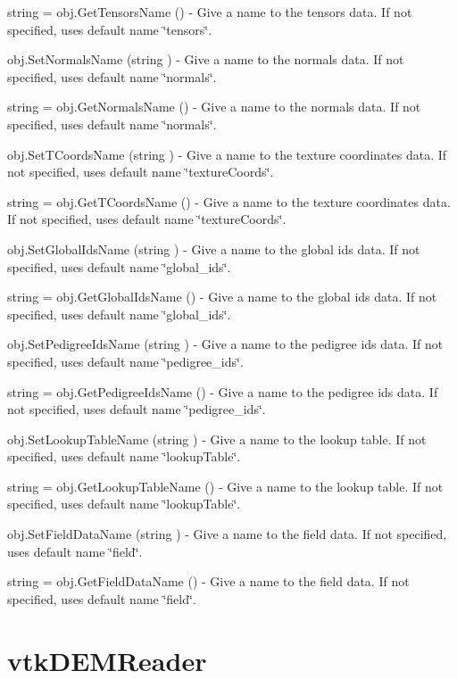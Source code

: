 \begin{DoxyItemize}
\item {\ttfamily string = obj.\-Get\-Tensors\-Name ()} -\/ Give a name to the tensors data. If not specified, uses default name \char`\"{}tensors\char`\"{}.  
\item {\ttfamily obj.\-Set\-Normals\-Name (string )} -\/ Give a name to the normals data. If not specified, uses default name \char`\"{}normals\char`\"{}.  
\item {\ttfamily string = obj.\-Get\-Normals\-Name ()} -\/ Give a name to the normals data. If not specified, uses default name \char`\"{}normals\char`\"{}.  
\item {\ttfamily obj.\-Set\-T\-Coords\-Name (string )} -\/ Give a name to the texture coordinates data. If not specified, uses default name \char`\"{}texture\-Coords\char`\"{}.  
\item {\ttfamily string = obj.\-Get\-T\-Coords\-Name ()} -\/ Give a name to the texture coordinates data. If not specified, uses default name \char`\"{}texture\-Coords\char`\"{}.  
\item {\ttfamily obj.\-Set\-Global\-Ids\-Name (string )} -\/ Give a name to the global ids data. If not specified, uses default name \char`\"{}global\-\_\-ids\char`\"{}.  
\item {\ttfamily string = obj.\-Get\-Global\-Ids\-Name ()} -\/ Give a name to the global ids data. If not specified, uses default name \char`\"{}global\-\_\-ids\char`\"{}.  
\item {\ttfamily obj.\-Set\-Pedigree\-Ids\-Name (string )} -\/ Give a name to the pedigree ids data. If not specified, uses default name \char`\"{}pedigree\-\_\-ids\char`\"{}.  
\item {\ttfamily string = obj.\-Get\-Pedigree\-Ids\-Name ()} -\/ Give a name to the pedigree ids data. If not specified, uses default name \char`\"{}pedigree\-\_\-ids\char`\"{}.  
\item {\ttfamily obj.\-Set\-Lookup\-Table\-Name (string )} -\/ Give a name to the lookup table. If not specified, uses default name \char`\"{}lookup\-Table\char`\"{}.  
\item {\ttfamily string = obj.\-Get\-Lookup\-Table\-Name ()} -\/ Give a name to the lookup table. If not specified, uses default name \char`\"{}lookup\-Table\char`\"{}.  
\item {\ttfamily obj.\-Set\-Field\-Data\-Name (string )} -\/ Give a name to the field data. If not specified, uses default name \char`\"{}field\char`\"{}.  
\item {\ttfamily string = obj.\-Get\-Field\-Data\-Name ()} -\/ Give a name to the field data. If not specified, uses default name \char`\"{}field\char`\"{}.  
\end{DoxyItemize}\hypertarget{vtkio_vtkdemreader}{}\section{vtk\-D\-E\-M\-Reader}\label{vtkio_vtkdemreader}
